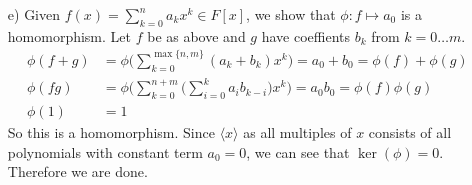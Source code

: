\begin{solution}
\begin{enumerate}
      \item[e)] Given $f(x) = \sum_{k=0}^n a_k x^k \in F[x]$, we show that $\phi: f \mapsto a_0$ is a homomorphism. Let $f$ be as above and $g$ have coeffients $b_k$ from $k=0 \ldots m$. 
      \begin{align}
        \phi(f + g) & = \phi \bigg( \sum_{k=0}^{\max\{n, m\}} (a_k + b_k) x^k \bigg) = a_0 + b_0 = \phi(f) + \phi(g) \\
        \phi(fg) & = \phi \bigg( \sum_{k=0}^{n+m} \Big( \sum_{i=0}^k a_i b_{k-i} \Big) x^k \bigg) = a_0 b_0 = \phi(f) \phi(g) \\
        \phi(1) & = 1
      \end{align} 
      So this is a homomorphism. Since $\langle x \rangle$ as all multiples of $x$ consists of all polynomials with constant term $a_0 = 0$, we can see that $\ker(\phi) = 0$. Therefore we are done. 
    \end{enumerate}
  \end{solution}


